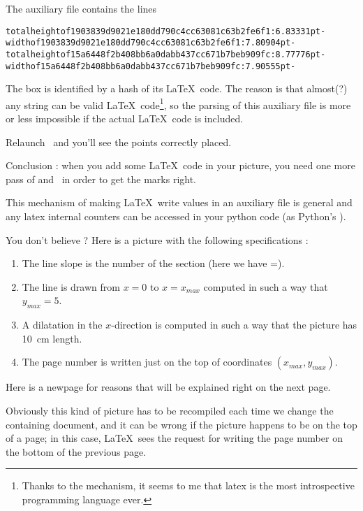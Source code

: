 The auxiliary file contains the lines
\begin{verbatim}
totalheightof1903839d9021e180dd790c4cc63081c63b2fe6f1:6.83331pt-
widthof1903839d9021e180dd790c4cc63081c63b2fe6f1:7.80904pt-
totalheightof15a6448f2b408bb6a0dabb437cc671b7beb909fc:8.77776pt-
widthof15a6448f2b408bb6a0dabb437cc671b7beb909fc:7.90555pt-
\end{verbatim}

The box is identified by a hash of its \LaTeX\ code. The reason is that almost(?) any string can be valid \LaTeX\ code\footnote{Thanks to the  mechanism, it seems to me that latex is the most introspective programming language ever.}, so the parsing of this auxiliary file is more or less impossible if the actual \LaTeX\ code is included.

Relaunch \pdfLaTeX\ and you'll see the points correctly placed.

Conclusion : when you add some \LaTeX\ code in your picture, you need one more pass of \pdfLaTeX and \yanntricks\ in order to get the marks right.

This mechanism of making \LaTeX\ write values in an auxiliary file is general and any latex internal counters can be accessed in your python code (as Python's ).

You don't believe ? Here is a picture with the following specifications :
\begin{enumerate}
    \item
        The line slope is the number of the section (here we have \info{\thesection}=\thesection).
\item
The line is drawn from \( x=0\) to \( x=x_{max}\) computed in such a way that \( y_{max}=5\). 
\item
A dilatation in the \( x\)-direction is computed in such a way that the picture has \SI{10}{\centi\meter} length.
\item
    The page number is written just on the top of coordinates \( (x_{max},y_{max})\).
\end{enumerate}

Here is a newpage for reasons that will be explained right on the next page.

\newpage

Obviously this kind of picture has to be recompiled each time we change the containing document, and it can be wrong if the picture happens to be on the top of a page; in this case, \LaTeX\ sees the request for writing the page number on the bottom of the previous page.

